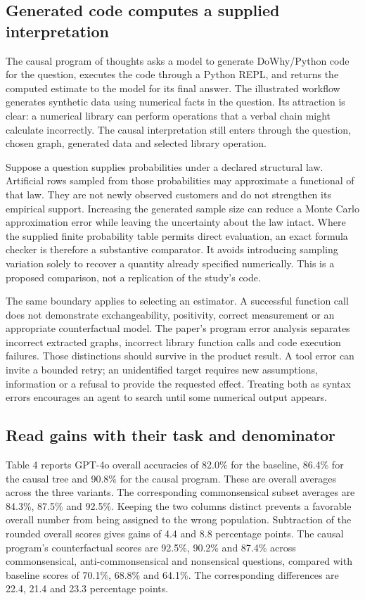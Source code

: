 \subsection{Generated code computes a supplied interpretation}
\label{exec21:prophets-calculation}
The causal program of thoughts asks a model to generate DoWhy/Python code for
the question, executes the code through a Python REPL, and returns the computed
estimate to the model for its final answer. The illustrated workflow generates
synthetic data using numerical facts in the question. Its attraction is clear:
a numerical library can perform operations that a verbal chain might calculate
incorrectly. The causal interpretation still enters through the question,
chosen graph, generated data and selected library operation.
\citep{exec21_prophets}

Suppose a question supplies probabilities under a declared structural law.
Artificial rows sampled from those probabilities may approximate a functional
of that law. They are not newly observed customers and do not strengthen its
empirical support. Increasing the generated sample size can reduce a Monte
Carlo approximation error while leaving the uncertainty about the law intact.
Where the supplied finite probability table permits direct evaluation, an exact
formula checker is therefore a substantive comparator. It avoids introducing
sampling variation solely to recover a quantity already specified numerically.
This is a proposed comparison, not a replication of the study's code.

The same boundary applies to selecting an estimator. A successful function call
does not demonstrate exchangeability, positivity, correct measurement or an
appropriate counterfactual model. The paper's program error analysis separates
incorrect extracted graphs, incorrect library function calls and code execution
failures. Those distinctions should survive in the product result. A tool error
can invite a bounded retry; an unidentified target requires new assumptions,
information or a refusal to provide the requested effect. Treating both as
syntax errors encourages an agent to search until some numerical output appears.
\citep{exec21_prophets}

\subsection{Read gains with their task and denominator}
\label{exec21:prophets-scores}
Table 4 reports GPT-4o overall accuracies of 82.0\% for the baseline,
86.4\% for the causal tree and 90.8\% for the causal program. These are
overall averages across the three variants. The corresponding commonsensical
subset averages are 84.3\%, 87.5\% and 92.5\%. Keeping the two columns distinct
prevents a favorable overall number from being assigned to the wrong
population. Subtraction of the rounded overall scores gives gains of 4.4 and
8.8 percentage points. The causal program's counterfactual scores are 92.5\%,
90.2\% and 87.4\% across commonsensical, anti-commonsensical and nonsensical
questions, compared with baseline scores of 70.1\%, 68.8\% and 64.1\%.
The corresponding differences are 22.4, 21.4 and 23.3 percentage points.
\citep{exec21_prophets,exec21_prophets_reference}

